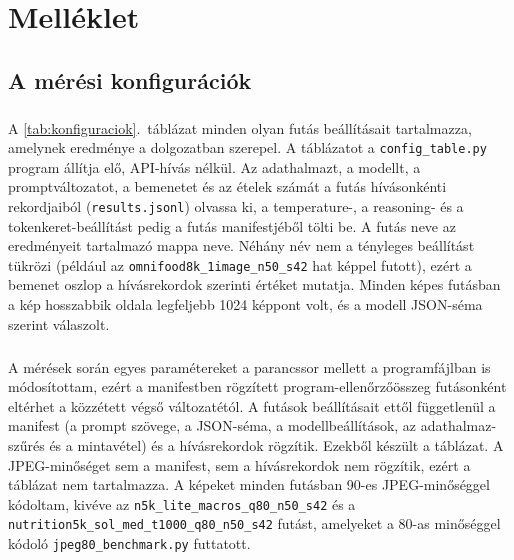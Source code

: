 \chapter{Melléklet}

\section{A mérési konfigurációk}
\label{sec:konfiguraciok}
\paragraph{}A \ref{tab:konfiguraciok}.~táblázat minden olyan futás beállításait tartalmazza, amelynek eredménye a dolgozatban szerepel. A táblázatot a \texttt{config\_table.py} program állítja elő, API-hívás nélkül. Az adathalmazt, a modellt, a promptváltozatot, a bemenetet és az ételek számát a futás hívásonkénti rekordjaiból (\texttt{results.jsonl}) olvassa ki, a temperature-, a reasoning- és a tokenkeret-beállítást pedig a futás manifestjéből tölti be. A futás neve az eredményeit tartalmazó mappa neve. Néhány név nem a tényleges beállítást tükrözi (például az \texttt{omnifood8k\_\allowbreak{}1image\_\allowbreak{}n50\_\allowbreak{}s42} hat képpel futott), ezért a bemenet oszlop a hívásrekordok szerinti értéket mutatja. Minden képes futásban a kép hosszabbik oldala legfeljebb 1024 képpont volt, és a modell JSON-séma szerint válaszolt.

\paragraph{}A mérések során egyes paramétereket a parancssor mellett a programfájlban is módosítottam, 
ezért a manifestben rögzített program-ellenőrzőösszeg futásonként eltérhet a közzétett végső 
változatétól. A futások beállításait ettől függetlenül a manifest (a prompt szövege, a JSON-séma, 
a modellbeállítások, az adathalmaz-szűrés és a mintavétel) és a hívásrekordok rögzítik. Ezekből 
készült a táblázat. A JPEG-minőséget sem a manifest, sem a hívásrekordok nem rögzítik, ezért a 
táblázat nem tartalmazza. A képeket minden futásban 90-es JPEG-minőséggel kódoltam, kivéve az 
\texttt{n5k\_\allowbreak{}lite\_\allowbreak{}macros\_\allowbreak{}q80\_\allowbreak{}n50\_\allowbreak{}s42} 
és a \texttt{nutrition5k\_\allowbreak{}sol\_\allowbreak{}med\_\allowbreak{}t1000\_\allowbreak{}q80\_\allowbreak{}n50\_\allowbreak{}s42} futást, 
amelyeket a 80-as minőséggel kódoló \texttt{jpeg80\_benchmark.py} futtatott.

